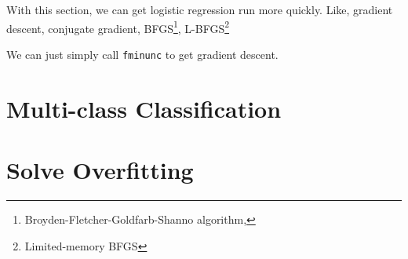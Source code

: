 \documentclass[black,simple]{../elegantbook}
\begin{document}
With this section, we can get logistic regression run more quickly. Like, gradient descent, conjugate gradient, BFGS\footnote{Broyden-Fletcher-Goldfarb-Shanno algorithm, }, L-BFGS\footnote{Limited-memory BFGS}

We can just simply call \lstinline{fminunc} to get gradient descent.


\section{Multi-class Classification}

\section{Solve Overfitting}




\let\chapname\undefined
\ifx\mainclass\undefined
\end{document}
